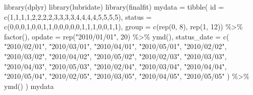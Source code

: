 \documentclass[
]{book}
\newenvironment{Shaded}{\begin{snugshade}}{\end{snugshade}}
\newcommand{\AttributeTok}[1]{\textcolor[rgb]{0.77,0.63,0.00}{#1}}
\newcommand{\DecValTok}[1]{\textcolor[rgb]{0.00,0.00,0.81}{#1}}
\newcommand{\FunctionTok}[1]{\textcolor[rgb]{0.00,0.00,0.00}{#1}}
\newcommand{\NormalTok}[1]{#1}
\newcommand{\OtherTok}[1]{\textcolor[rgb]{0.56,0.35,0.01}{#1}}
\newcommand{\SpecialCharTok}[1]{\textcolor[rgb]{0.00,0.00,0.00}{#1}}
\newcommand{\StringTok}[1]{\textcolor[rgb]{0.31,0.60,0.02}{#1}}
\begin{document}
\begin{Shaded}
\begin{Highlighting}[]
\FunctionTok{library}\NormalTok{(dplyr)}
\FunctionTok{library}\NormalTok{(lubridate)}
\FunctionTok{library}\NormalTok{(finalfit)}
\NormalTok{mydata }\OtherTok{=} \FunctionTok{tibble}\NormalTok{(}
  \AttributeTok{id =} \FunctionTok{c}\NormalTok{(}\DecValTok{1}\NormalTok{,}\DecValTok{1}\NormalTok{,}\DecValTok{1}\NormalTok{,}\DecValTok{1}\NormalTok{,}\DecValTok{2}\NormalTok{,}\DecValTok{2}\NormalTok{,}\DecValTok{2}\NormalTok{,}\DecValTok{2}\NormalTok{,}\DecValTok{3}\NormalTok{,}\DecValTok{3}\NormalTok{,}\DecValTok{3}\NormalTok{,}\DecValTok{3}\NormalTok{,}\DecValTok{4}\NormalTok{,}\DecValTok{4}\NormalTok{,}\DecValTok{4}\NormalTok{,}\DecValTok{4}\NormalTok{,}\DecValTok{5}\NormalTok{,}\DecValTok{5}\NormalTok{,}\DecValTok{5}\NormalTok{,}\DecValTok{5}\NormalTok{),}
  \AttributeTok{status =} \FunctionTok{c}\NormalTok{(}\DecValTok{0}\NormalTok{,}\DecValTok{0}\NormalTok{,}\DecValTok{0}\NormalTok{,}\DecValTok{1}\NormalTok{,}\DecValTok{0}\NormalTok{,}\DecValTok{0}\NormalTok{,}\DecValTok{1}\NormalTok{,}\DecValTok{1}\NormalTok{,}\DecValTok{0}\NormalTok{,}\DecValTok{0}\NormalTok{,}\DecValTok{0}\NormalTok{,}\DecValTok{0}\NormalTok{,}\DecValTok{0}\NormalTok{,}\DecValTok{1}\NormalTok{,}\DecValTok{1}\NormalTok{,}\DecValTok{1}\NormalTok{,}\DecValTok{0}\NormalTok{,}\DecValTok{0}\NormalTok{,}\DecValTok{1}\NormalTok{,}\DecValTok{1}\NormalTok{),}
  \AttributeTok{group =} \FunctionTok{c}\NormalTok{(}\FunctionTok{rep}\NormalTok{(}\DecValTok{0}\NormalTok{, }\DecValTok{8}\NormalTok{), }\FunctionTok{rep}\NormalTok{(}\DecValTok{1}\NormalTok{, }\DecValTok{12}\NormalTok{)) }\SpecialCharTok{\%\textgreater{}\%} \FunctionTok{factor}\NormalTok{(),}
  \AttributeTok{opdate =} \FunctionTok{rep}\NormalTok{(}\StringTok{"2010/01/01"}\NormalTok{, }\DecValTok{20}\NormalTok{) }\SpecialCharTok{\%\textgreater{}\%} \FunctionTok{ymd}\NormalTok{(),}
  \AttributeTok{status\_date =} \FunctionTok{c}\NormalTok{(}
    \StringTok{"2010/02/01"}\NormalTok{, }\StringTok{"2010/03/01"}\NormalTok{, }\StringTok{"2010/04/01"}\NormalTok{, }\StringTok{"2010/05/01"}\NormalTok{,}
    \StringTok{"2010/02/02"}\NormalTok{, }\StringTok{"2010/03/02"}\NormalTok{, }\StringTok{"2010/04/02"}\NormalTok{, }\StringTok{"2010/05/02"}\NormalTok{,}
    \StringTok{"2010/02/03"}\NormalTok{, }\StringTok{"2010/03/03"}\NormalTok{, }\StringTok{"2010/04/03"}\NormalTok{, }\StringTok{"2010/05/03"}\NormalTok{,}
    \StringTok{"2010/02/04"}\NormalTok{, }\StringTok{"2010/03/04"}\NormalTok{, }\StringTok{"2010/04/04"}\NormalTok{, }\StringTok{"2010/05/04"}\NormalTok{,}
    \StringTok{"2010/02/05"}\NormalTok{, }\StringTok{"2010/03/05"}\NormalTok{, }\StringTok{"2010/04/05"}\NormalTok{, }\StringTok{"2010/05/05"}
\NormalTok{  ) }\SpecialCharTok{\%\textgreater{}\%} \FunctionTok{ymd}\NormalTok{()}
\NormalTok{)}
\NormalTok{mydata}
\end{Highlighting}
\end{Shaded}
\end{document}
